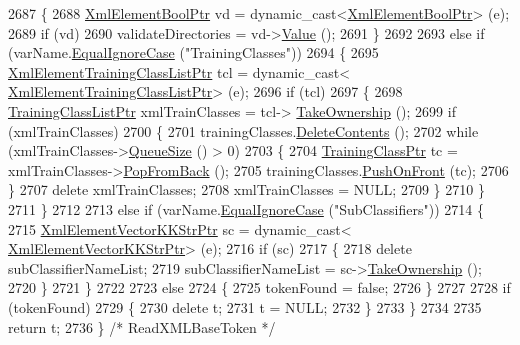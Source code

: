 \begin{DoxyCode}
2687     \{
2688       \hyperlink{class_k_k_b_1_1_xml_element_bool}{XmlElementBoolPtr}  vd = \textcolor{keyword}{dynamic\_cast<}\hyperlink{class_k_k_b_1_1_xml_element_bool}{XmlElementBoolPtr}\textcolor{keyword}{>} (e);
2689       \textcolor{keywordflow}{if}  (vd)
2690         validateDirectories = vd->\hyperlink{class_k_k_b_1_1_xml_element_bool_a8d4ec6615a74cca30a79d288d08cccd0}{Value} ();
2691     \}
2692 
2693     \textcolor{keywordflow}{else} \textcolor{keywordflow}{if}  (varName.\hyperlink{class_k_k_b_1_1_k_k_str_a562f9696417c53f66bc4088eac072ab5}{EqualIgnoreCase}  (\textcolor{stringliteral}{"TrainingClasses"}))
2694     \{
2695       \hyperlink{class_k_k_b_1_1_xml_element_template}{XmlElementTrainingClassListPtr}  tcl = \textcolor{keyword}{dynamic\_cast<}
      \hyperlink{class_k_k_b_1_1_xml_element_template}{XmlElementTrainingClassListPtr}\textcolor{keyword}{>} (e);
2696       \textcolor{keywordflow}{if}  (tcl)
2697       \{
2698         \hyperlink{class_k_k_m_l_l_1_1_training_class_list}{TrainingClassListPtr}  xmlTrainClasses = tcl->
      \hyperlink{class_k_k_b_1_1_xml_element_template_a1fd0ce7b0d0ee0d57fb29ca09d3ad6fc}{TakeOwnership} ();
2699         \textcolor{keywordflow}{if}  (xmlTrainClasses)
2700         \{
2701           trainingClasses.\hyperlink{class_k_k_b_1_1_k_k_queue_a72dbe1e65d567536dbf4be3617230254}{DeleteContents} ();
2702           \textcolor{keywordflow}{while}  (xmlTrainClasses->\hyperlink{class_k_k_b_1_1_k_k_queue_a1dab601f75ee6a65d97f02bddf71c40d}{QueueSize} () > 0)
2703           \{
2704             \hyperlink{class_k_k_m_l_l_1_1_training_class}{TrainingClassPtr}  tc = xmlTrainClasses->\hyperlink{class_k_k_b_1_1_k_k_queue_a03844c19a838fed7e7bcc5816846dcfd}{PopFromBack} ();
2705             trainingClasses.\hyperlink{class_k_k_b_1_1_k_k_queue_a07b83a99241a167f7a395a40d32f6380}{PushOnFront} (tc);
2706           \}
2707           \textcolor{keyword}{delete}  xmlTrainClasses;
2708           xmlTrainClasses = NULL;
2709         \}
2710       \}
2711     \}
2712 
2713     \textcolor{keywordflow}{else} \textcolor{keywordflow}{if}  (varName.\hyperlink{class_k_k_b_1_1_k_k_str_a562f9696417c53f66bc4088eac072ab5}{EqualIgnoreCase}  (\textcolor{stringliteral}{"SubClassifiers"}))
2714     \{
2715       \hyperlink{class_k_k_b_1_1_xml_element_template}{XmlElementVectorKKStrPtr}  sc = \textcolor{keyword}{dynamic\_cast<}
      \hyperlink{class_k_k_b_1_1_xml_element_template}{XmlElementVectorKKStrPtr}\textcolor{keyword}{>} (e);
2716       \textcolor{keywordflow}{if}  (sc)
2717       \{
2718         \textcolor{keyword}{delete} subClassifierNameList;
2719         subClassifierNameList = sc->\hyperlink{class_k_k_b_1_1_xml_element_template_a1fd0ce7b0d0ee0d57fb29ca09d3ad6fc}{TakeOwnership} ();
2720       \}
2721     \}
2722 
2723     \textcolor{keywordflow}{else}
2724     \{
2725       tokenFound = \textcolor{keyword}{false};
2726     \}
2727 
2728     \textcolor{keywordflow}{if}  (tokenFound)
2729     \{
2730       \textcolor{keyword}{delete}  t;
2731       t = NULL;
2732     \}
2733   \}
2734 
2735   \textcolor{keywordflow}{return}  t;
2736 \}  \textcolor{comment}{/* ReadXMLBaseToken */}
\end{DoxyCode}

